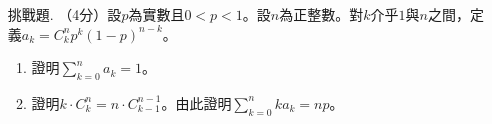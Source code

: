 \documentclass[12pt]{article}
\begin{document}
\begin{enumerate}
        \hrulefill

        \hrulefill

        \hrulefill

        \hrulefill

        \hrulefill

        \hrulefill

        \hrulefill

        \hrulefill

        \hrulefill

        \hrulefill

        \hrulefill

        \hrulefill
        \item[挑戰題.] （4分）設$p$為實數且$0<p<1$。設$n$為正整數。對$k$介乎$1$與$n$之間，定義$a_k=C_k^n p^k(1-p)^{n-k}$。\begin{enumerate}
            \item 證明$\displaystyle\sum_{k=0}^{n}a_k=1$。
            \item 證明$k\cdot C_k^n=n\cdot C_{k-1}^{n-1}$。由此證明$\displaystyle\sum_{k=0}^{n}ka_k=np$。
        \end{enumerate}

        \hrulefill

        \hrulefill

        \hrulefill

        \hrulefill

        \hrulefill

        \hrulefill

        \hrulefill

        \hrulefill

        \hrulefill

        \hrulefill

        \hrulefill

        \hrulefill

        \hrulefill

        \hrulefill

        \hrulefill

        \hrulefill

        \hrulefill

        \hrulefill

        \hrulefill

        \hrulefill

        \hrulefill

        \hrulefill

        \hrulefill


\end{enumerate}
\end{document}
